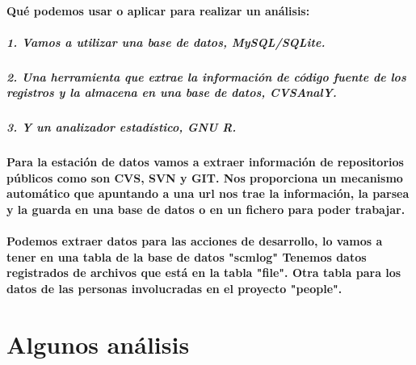 \paragraph{Qu\'e podemos usar o aplicar para realizar un an\'alisis:}
\subparagraph{1. Vamos a utilizar una base de datos, MySQL/SQLite.}
\subparagraph{2. Una herramienta que extrae la informaci\'on de c\'odigo fuente de los registros y la almacena en una base de datos, CVSAnalY.}
\subparagraph{3. Y un analizador estad\'istico, GNU R.}
\paragraph{Para la estaci\'on de datos vamos a extraer informaci\'on de repositorios p\'ublicos como son CVS, SVN y GIT. Nos proporciona un mecanismo autom\'atico que apuntando a una url nos trae la informaci\'on, la parsea y la guarda en una base de datos o en un fichero para poder trabajar.}
\paragraph{Podemos extraer datos para las acciones de desarrollo, lo vamos a tener en una tabla de la base de datos "scmlog"
Tenemos datos registrados de archivos que est\'a en la tabla "file".
Otra tabla para los datos de las personas involucradas en el proyecto "people".}
\section{Algunos an\'alisis}

